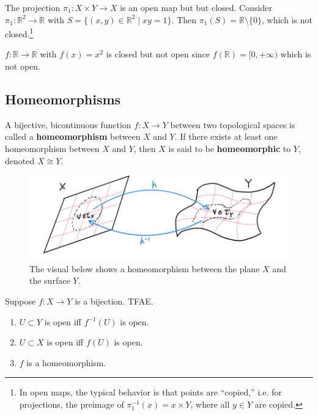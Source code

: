   \begin{example}
    The projection $\pi_1: X \times Y \rightarrow X$ is an open map but but closed. Consider $\pi_1: \mathbb{R}^2 \rightarrow \mathbb{R}$ with $S = \{(x, y) \in \mathbb{R}^2 \mid xy = 1 \}$. Then $\pi_1 (S) = \mathbb{R} \setminus \{0\}$, which is not closed.\footnote{In open maps, the typical behavior is that points are ``copied,'' i.e. for projections, the preimage of $\pi_1^{-1} (x) = x \times Y$, where all $y \in Y$ are copied.}
  \end{example}

  \begin{example}
    $f: \mathbb{R} \rightarrow \mathbb{R}$ with $f(x) = x^2$ is closed but not open since $f(\mathbb{R}) = [0, +\infty)$ which is not open. 
  \end{example}

\subsection{Homeomorphisms}

  \begin{definition}[Homeomorphism]
    A bijective, bicontinuous function $f: X \longrightarrow Y$ between two topological spaces is called a \textbf{homeomorphism} between $X$ and $Y$. If there exists at least one homeomorphism between $X$ and $Y$, then $X$ is said to be \textbf{homeomorphic} to $Y$, denoted $X \cong Y$. 

    \begin{figure}[H]
      \centering 
      \includegraphics[scale=0.4]{img/Homeomorphism_of_Plane.png}
      \caption{The visual below shows a homeomorphism between the plane $X$ and the surface $Y$.}
      \label{fig:homeomorphism_plane}
    \end{figure}
  \end{definition}

  \begin{theorem}
    Suppose $f: X \rightarrow Y$ is a bijection. TFAE. 
    \begin{enumerate}
      \item $U \subset Y$ is open iff $f^{-1} (U)$ is open. 
      \item $U \subset X$ is open iff $f(U)$ is open. 
      \item $f$ is a homeomorphism. 
    \end{enumerate}
  \end{theorem} 

